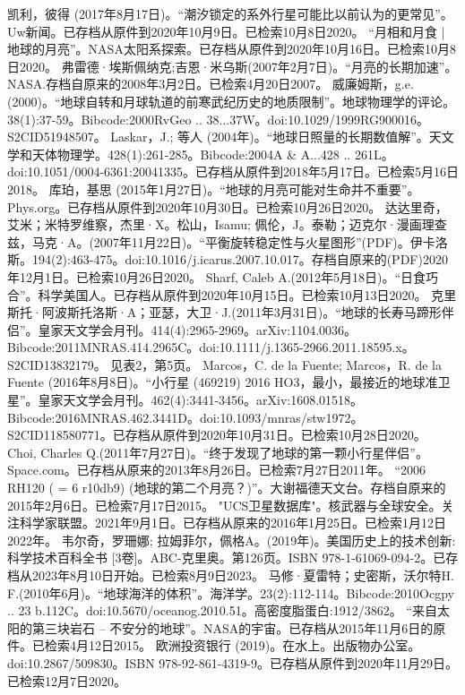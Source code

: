 \begin{enumerate}
 凯利，彼得 (2017年8月17日)。“潮汐锁定的系外行星可能比以前认为的更常见”。Uw新闻。已存档从原件到2020年10月9日。已检索10月8日2020。
 “月相和月食 | 地球的月亮”。NASA太阳系探索。已存档从原件到2020年10月16日。已检索10月8日2020。
 弗雷德·埃斯佩纳克;吉恩·米乌斯(2007年2月7日)。“月亮的长期加速”。NASA.存档自原来的2008年3月2日。已检索4月20日2007。
 威廉姆斯，g.e.(2000)。“地球自转和月球轨道的前寒武纪历史的地质限制”。地球物理学的评论。38(1):37-59。Bibcode:2000RvGeo .. 38...37W。doi:10.1029/1999RG900016。S2CID51948507。 
 Laskar，J.; 等人 (2004年)。“地球日照量的长期数值解”。天文学和天体物理学。428(1):261-285。Bibcode:2004A & A...428 .. 261L。doi:10.1051/0004-6361:20041335。已存档从原件到2018年5月17日。已检索5月16日2018。
 库珀，基思 (2015年1月27日)。“地球的月亮可能对生命并不重要”。Phys.org。已存档从原件到2020年10月30日。已检索10月26日2020。
 达达里奇，艾米；米特罗维察，杰里·X。松山，Isamu; 佩伦，J。泰勒；迈克尔·漫画理查兹，马克·A。(2007年11月22日)。“平衡旋转稳定性与火星图形”(PDF)。伊卡洛斯。194(2):463-475。doi:10.1016/j.icarus.2007.10.017。存档自原来的(PDF)2020年12月1日。已检索10月26日2020。
 Sharf, Caleb A.(2012年5月18日)。“日食巧合”。科学美国人。已存档从原件到2020年10月15日。已检索10月13日2020。
 克里斯托·阿波斯托洛斯·A；亚瑟，大卫·J.(2011年3月31日)。“地球的长寿马蹄形伴侣”。皇家天文学会月刊。414(4):2965-2969。arXiv:1104.0036。Bibcode:2011MNRAS.414.2965C。doi:10.1111/j.1365-2966.2011.18595.x。S2CID13832179。 见表2，第5页。
 Marcos，C. de la Fuente; Marcos，R. de la Fuente (2016年8月8日)。“小行星 (469219) 2016 HO3，最小，最接近的地球准卫星”。皇家天文学会月刊。462(4):3441-3456。arXiv:1608.01518。Bibcode:2016MNRAS.462.3441D。doi:10.1093/mnras/stw1972。S2CID118580771。已存档从原件到2020年10月31日。已检索10月28日2020。 
 Choi, Charles Q.(2011年7月27日)。“终于发现了地球的第一颗小行星伴侣”。Space.com。已存档从原来的2013年8月26日。已检索7月27日2011年。
 “2006 RH120 ( = 6 r10db9) (地球的第二个月亮？)”。大谢福德天文台。存档自原来的2015年2月6日。已检索7月17日2015。
 "UCS卫星数据库"。核武器与全球安全。关注科学家联盟。2021年9月1日。已存档从原来的2016年1月25日。已检索1月12日2022年。
 韦尔奇，罗珊娜; 拉姆菲尔，佩格A。(2019年)。美国历史上的技术创新: 科学技术百科全书 [3卷]。ABC-克里奥。第126页。ISBN 978-1-61069-094-2。已存档从2023年8月10日开始。已检索8月9日2023。
 马修·夏雷特；史密斯，沃尔特H. F.(2010年6月)。“地球海洋的体积”。海洋学。23(2):112-114。Bibcode:2010Ocgpy .. 23 b.112C。doi:10.5670/oceanog.2010.51。高密度脂蛋白:1912/3862。
 “来自太阳的第三块岩石 -- 不安分的地球”。NASA的宇宙。已存档从2015年11月6日的原件。已检索4月12日2015。
 欧洲投资银行 (2019)。在水上。出版物办公室。doi:10.2867/509830。ISBN 978-92-861-4319-9。已存档从原件到2020年11月29日。已检索12月7日2020。

\end{enumerate}
